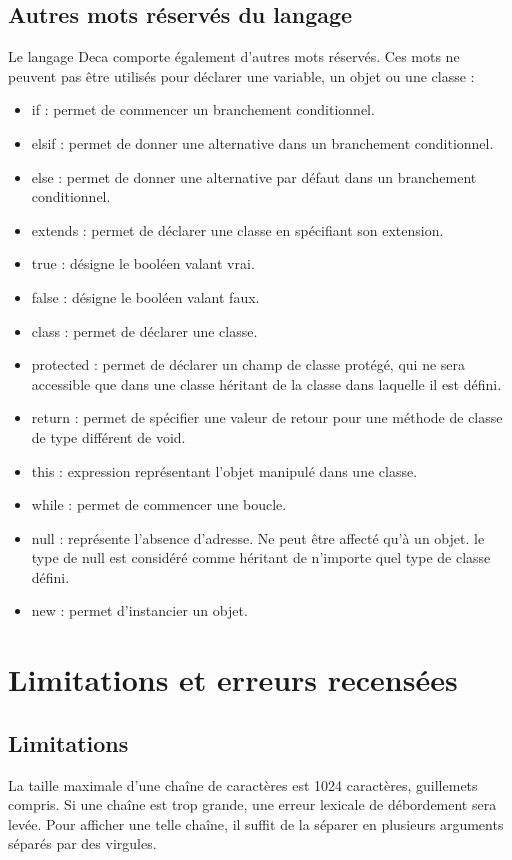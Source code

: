 \documentclass[12pt]{article}
\begin{document}
\subsection{Autres mots réservés du langage}
Le langage Deca comporte également d'autres mots réservés. Ces mots ne peuvent pas être utilisés pour déclarer une variable, un objet ou une classe : \\
\begin{itemize}
\item if : permet de commencer un branchement conditionnel.
\item elsif : permet de donner une alternative dans un branchement conditionnel.
\item else : permet de donner une alternative par défaut dans un branchement conditionnel.
\item extends : permet de déclarer une classe en spécifiant son extension.
\item true : désigne le booléen valant vrai.
\item false : désigne le booléen valant faux.
\item class : permet de déclarer une classe.
\item protected : permet de déclarer un champ de classe protégé, qui ne sera accessible que dans une classe héritant de la classe dans laquelle il est défini.
\item return : permet de spécifier une valeur de retour pour une méthode de classe de type différent de void.
\item this : expression représentant l'objet manipulé dans une classe.
\item while : permet de commencer une boucle.
\item null : représente l'absence d'adresse. Ne peut être affecté qu'à un objet. le type de null est considéré comme héritant de n'importe quel type de classe défini.
\item new : permet d'instancier un objet.
\end{itemize}
\section{Limitations et erreurs recensées}

\subsection{Limitations}
La taille maximale d'une chaîne de caractères est 1024 caractères, guillemets 
compris. Si une chaîne est trop grande, une erreur lexicale de débordement 
sera levée. Pour afficher une telle chaîne, il suffit de la séparer
en plusieurs arguments séparés par des virgules.
\end{document}
